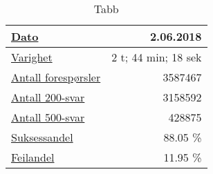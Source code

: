 \begin{table}[hbtp]
  \begin{center}
    \begin{tabular}{ | l | r |}
      \hline
      \underline{Dato} & 2.06.2018 \\ \hline
      \underline{Varighet} & 2 t; 44 min; 18 sek \\ \hline
      \underline{Antall forespørsler} & 3587467 \\ \hline
      \underline{Antall 200-svar} & 3158592 \\ \hline
      \underline{Antall 500-svar} & 428875 \\ \hline
      \underline{Suksessandel} & 88.05 \% \\ \hline
      \underline{Feilandel} & 11.95 \% \\ \hline
    \end{tabular}
  \end{center}
  \caption{Tabb}
  \label{frontend1}
\end{table}
